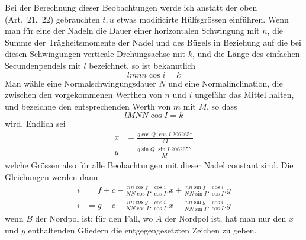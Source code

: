 Bei der Berechnung dieser Beobachtungen werde ich anstatt der oben (Art.\ 21.\ 22) gebrauchten $t,u$ etwas modificirte Hülfsgrössen einführen. Wenn man für eine der Nadeln die Dauer einer horizontalen Schwingung mit $n$, die Summe der Trägheitsmomente der Nadel und des Bügels in Beziehung auf die bei diesen Schwingungen verticale Drehungsachse mit $k$, und die Länge des einfachen Secundenpendels mit $l$ bezeichnet. so ist bekanntlich
\[
lmnn\cos i=k
\]
Man wähle eine Normalschwingungsdauer $N$ und eine Normalinclination, die zwischen den vorgekommenen Werthen von $n$ und $i$ ungefähr das Mittel halten, und bezeichne den entsprechenden Werth von $m$ mit $M$, so dass
\[
lMNN\cos I=k
\]
wird. Endlich sei
\[
\begin{aligned}
x&=\frac{q\cos Q.\cos I.206265''}{M}\\
y&=\frac{q\sin Q.\sin I.206265''}{M}
\end{aligned}
\]
welche Grössen also für alle Beobachtungen mit dieser Nadel constant sind. Die Gleichungen werden dann
\[
\begin{aligned}
i&=f+c-\frac{nn\cos f}{NN\cos I}.\frac{\cos i}{\cos I}.x+\frac{nn\sin f}{NN\sin I}.\frac{\cos i}{\cos I}.y\\
i&=g-c-\frac{nn\cos g}{NN\cos I}.\frac{\cos i}{\cos I}.x-\frac{nn\sin g}{NN\sin I}.\frac{\cos i}{\cos I}.y
\end{aligned}
\]
wenn $B$ der Nordpol ist; für den Fall, wo $A$ der Nordpol ist, hat man nur den $x$ und $y$ enthaltenden Gliedern die entgegengesetzten Zeichen zu geben.

